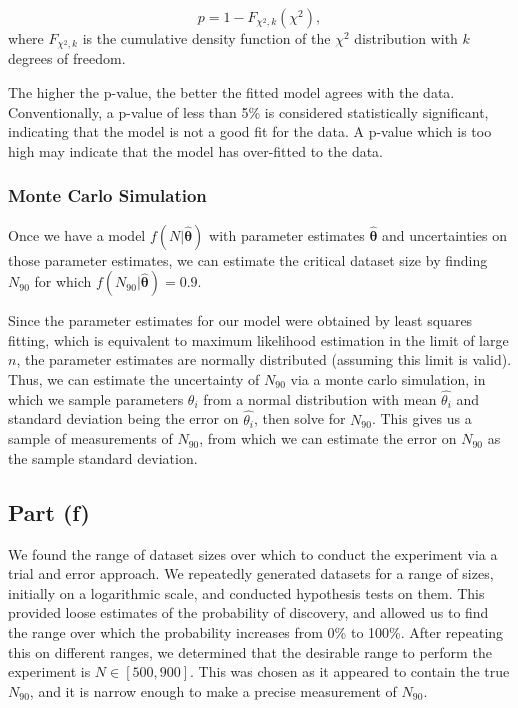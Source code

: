 \documentclass{article}
\begin{document}
\begin{equation}
p = 1 - F_{\chi^2, k}(\chi^2),
\label{pval_chi2}
\end{equation}
where $F_{\chi^2, k}$ is the cumulative density function of the $\chi^2$ distribution with $k$ degrees of freedom. 

The higher the p-value, the better the fitted model agrees with the data. Conventionally, a p-value of less than 5\% is considered statistically significant, indicating that the model is not a good fit for the data. A p-value which is too high may indicate that the model has over-fitted to the data.

\subsubsection*{Monte Carlo Simulation}

Once we have a model $f(N| \hat{\boldsymbol{\theta}})$ with parameter estimates $\hat{\boldsymbol{\theta}}$ and uncertainties on those parameter estimates, we can estimate the critical dataset size by finding $N_{90}$ for which $f(N_{90}| \hat{\boldsymbol{\theta}}) = 0.9$. 

Since the parameter estimates for our model were obtained by least squares fitting, which is equivalent to maximum likelihood estimation in the limit of large $n$, the parameter estimates are normally distributed (assuming this limit is valid). Thus, we can estimate the uncertainty of $N_{90}$ via a monte carlo simulation, in which we sample parameters $\theta_i$ from a normal distribution with mean $\hat{\theta_i}$ and standard deviation being the error on $\hat{\theta_i}$, then solve for $N_{90}$. This gives us a sample of measurements of $N_{90}$, from which we can estimate the error on $N_{90}$ as the sample standard deviation.

\subsection*{Part (f)}

We found the range of dataset sizes over which to conduct the experiment via a trial and error approach. We repeatedly generated datasets for a range of sizes, initially on a logarithmic scale, and conducted hypothesis tests on them. This provided loose estimates of the probability of discovery, and allowed us to find the range over which the probability increases from 0\% to 100\%. After repeating this on different ranges, we determined that the desirable range to perform the experiment is $N \in [500, 900]$. This was chosen as it appeared to contain the true $N_{90}$, and it is narrow enough to make a precise measurement of $N_{90}$. 
\end{document}
